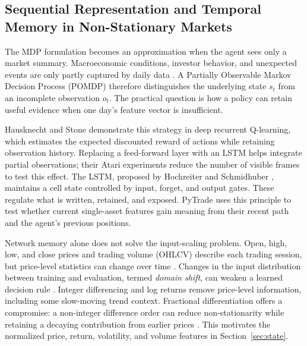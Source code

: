 \subsection{Sequential Representation and Temporal Memory in Non-Stationary Markets}

The MDP formulation becomes an approximation when the agent sees only a market summary. Macroeconomic conditions, investor behavior, and unexpected events are only partly captured by daily data \cite{Zhang2020}. A Partially Observable Markov Decision Process (POMDP) therefore distinguishes the underlying state $s_t$ from an incomplete observation $o_t$. The practical question is how a policy can retain useful evidence when one day's feature vector is insufficient.

Hausknecht and Stone \cite{hausknecht2015deep} demonstrate this strategy in deep recurrent Q-learning, which estimates the expected discounted reward of actions while retaining observation history. Replacing a feed-forward layer with an LSTM helps integrate partial observations; their Atari experiments reduce the number of visible frames to test this effect. The LSTM, proposed by Hochreiter and Schmidhuber \cite{Hochreiter1997}, maintains a cell state controlled by input, forget, and output gates. These regulate what is written, retained, and exposed. PyTrade uses this principle to test whether current single-asset features gain meaning from their recent path and the agent's previous positions.

Network memory alone does not solve the input-scaling problem. Open, high, low, and close prices and trading volume (OHLCV) describe each trading session, but price-level statistics can change over time \cite{Schmitt_2013,Cabral2026}. Changes in the input distribution between training and evaluation, termed \emph{domain shift}, can weaken a learned decision rule \cite{LopezdePrado.2018}. Integer differencing and log returns remove price-level information, including some slow-moving trend context. Fractional differentiation offers a compromise: a non-integer difference order can reduce non-stationarity while retaining a decaying contribution from earlier prices \cite{LopezdePrado.2018}. This motivates the normalized price, return, volatility, and volume features in Section~\ref{sec:state}.

